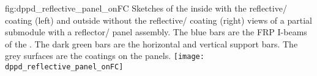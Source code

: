 \begin{dunefigure}{fig:dppd_reflective_panel_onFC}
{Sketches of the inside with the reflective/ coating (left) and outside without the reflective/ coating (right) views of a partial  submodule with a reflector/ panel assembly. The blue bars are the FRP I-beams of the . The dark green bars are the horizontal and vertical support bars. The grey surfaces are the  coatings on the panels.}
\texttt{[image: dppd\_reflective\_panel\_onFC]}
\end{dunefigure}
